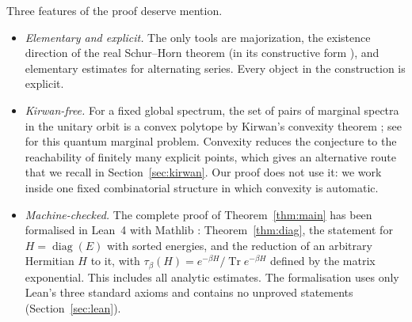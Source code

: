 \documentclass[11pt]{amsart}
\theoremstyle{definition}
\theoremstyle{remark}
\numberwithin{equation}{section}
\newcommand{\Tr}{\operatorname{Tr}}
\newcommand{\diag}{\operatorname{diag}}
\begin{document}
Three features of the proof deserve mention.
\begin{itemize}
\item \emph{Elementary and explicit.} The only tools are majorization, the existence direction of
the real Schur--Horn theorem (in its constructive form \cite{ChanLi1983}), and elementary estimates
for alternating series. Every object in the construction is explicit.
\item \emph{Kirwan-free.} For a fixed global spectrum, the set of pairs of marginal spectra in the
unitary orbit is a convex polytope by Kirwan's convexity theorem \cite{Kirwan1984}; see
\cite{Klyachko2004,DaftuarHayden2005,ChristandlMitchison2006} for this quantum marginal problem.
Convexity reduces the conjecture to the reachability of finitely many explicit points, which gives an
alternative route that we recall in Section~\ref{sec:kirwan}. Our proof does not use it: we work
inside one fixed combinatorial structure in which convexity is automatic.
\item \emph{Machine-checked.} The complete proof of Theorem~\ref{thm:main} has been formalised in
Lean~4 \cite{deMouraUllrich2021} with Mathlib \cite{mathlib2020}: Theorem~\ref{thm:diag}, the statement
for $H=\diag(E)$ with sorted energies, and the reduction of an arbitrary Hermitian $H$ to it, with
$\tau_\beta(H)=e^{-\beta H}/\Tr e^{-\beta H}$ defined by the matrix exponential. This includes all
analytic estimates. The formalisation uses only Lean's three standard axioms and contains no
unproved statements (Section~\ref{sec:lean}).
\end{itemize}
\end{document}
